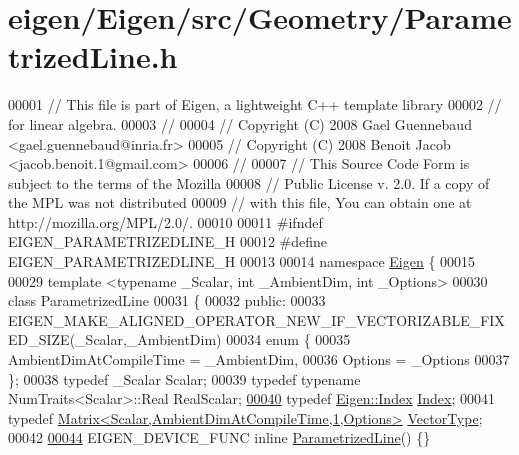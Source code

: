 \hypertarget{eigen_2_eigen_2src_2_geometry_2_parametrized_line_8h_source}{}\section{eigen/\+Eigen/src/\+Geometry/\+Parametrized\+Line.h}
\label{eigen_2_eigen_2src_2_geometry_2_parametrized_line_8h_source}

\begin{DoxyCode}
00001 \textcolor{comment}{// This file is part of Eigen, a lightweight C++ template library}
00002 \textcolor{comment}{// for linear algebra.}
00003 \textcolor{comment}{//}
00004 \textcolor{comment}{// Copyright (C) 2008 Gael Guennebaud <gael.guennebaud@inria.fr>}
00005 \textcolor{comment}{// Copyright (C) 2008 Benoit Jacob <jacob.benoit.1@gmail.com>}
00006 \textcolor{comment}{//}
00007 \textcolor{comment}{// This Source Code Form is subject to the terms of the Mozilla}
00008 \textcolor{comment}{// Public License v. 2.0. If a copy of the MPL was not distributed}
00009 \textcolor{comment}{// with this file, You can obtain one at http://mozilla.org/MPL/2.0/.}
00010 
00011 \textcolor{preprocessor}{#ifndef EIGEN\_PARAMETRIZEDLINE\_H}
00012 \textcolor{preprocessor}{#define EIGEN\_PARAMETRIZEDLINE\_H}
00013 
00014 \textcolor{keyword}{namespace }\hyperlink{namespace_eigen}{Eigen} \{ 
00015 
00029 \textcolor{keyword}{template} <\textcolor{keyword}{typename} \_Scalar, \textcolor{keywordtype}{int} \_AmbientDim, \textcolor{keywordtype}{int} \_Options>
00030 \textcolor{keyword}{class }ParametrizedLine
00031 \{
00032 \textcolor{keyword}{public}:
00033   EIGEN\_MAKE\_ALIGNED\_OPERATOR\_NEW\_IF\_VECTORIZABLE\_FIXED\_SIZE(\_Scalar,\_AmbientDim)
00034   \textcolor{keyword}{enum} \{
00035     AmbientDimAtCompileTime = \_AmbientDim,
00036     Options = \_Options
00037   \};
00038   \textcolor{keyword}{typedef} \_Scalar Scalar;
00039   \textcolor{keyword}{typedef} \textcolor{keyword}{typename} NumTraits<Scalar>::Real RealScalar;
\hyperlink{group___geometry___module_a3c9f84dd8608940282b16652a296c764}{00040}   \textcolor{keyword}{typedef} \hyperlink{namespace_eigen_a62e77e0933482dafde8fe197d9a2cfde}{Eigen::Index} \hyperlink{group___geometry___module_a3c9f84dd8608940282b16652a296c764}{Index}; 
00041   \textcolor{keyword}{typedef} \hyperlink{group___core___module}{Matrix<Scalar,AmbientDimAtCompileTime,1,Options>} 
      \hyperlink{group___core___module}{VectorType};
00042 
\hyperlink{group___geometry___module_a7c23f36d93cf3b3c2b37fd9f9eda5685}{00044}   EIGEN\_DEVICE\_FUNC \textcolor{keyword}{inline} \hyperlink{group___geometry___module_a7c23f36d93cf3b3c2b37fd9f9eda5685}{ParametrizedLine}() \{\}

\end{DoxyCode}
